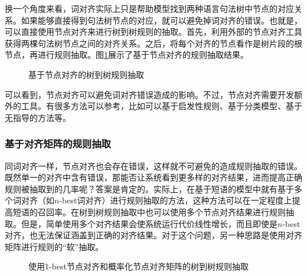 \parinterval 换一个角度来看，词对齐实际上只是帮助模型找到两种语言句法树中节点的对应关系。如果能够直接得到句法树节点的对应，就可以避免掉词对齐的错误。也就是，可以直接使用节点对齐来进行树到树规则的抽取。首先，利用外部的节点对齐工具获得两棵句法树节点之间的对齐关系。之后，将每个对齐的节点看作是树片段的根节点，再进行规则抽取。图\ref{fig:4-62}展示了基于节点对齐的规则抽取结果。

\begin{figure}[htb]
\centering

\caption{基于节点对齐的树到树规则抽取}
\label{fig:4-62}
\end{figure}

\parinterval 可以看到，节点对齐可以避免词对齐错误造成的影响。不过，节点对齐需要开发额外的工具。有很多方法可以参考，比如可以基于启发性规则\cite{DBLP:conf/coling/GrovesHW04}、基于分类模型\cite{DBLP:conf/coling/SunZT10}、基于无指导的方法\cite{xiao2013unsupervised}等。


\subsubsection{基于对齐矩阵的规则抽取}

\parinterval 同词对齐一样，节点对齐也会存在错误，这样就不可避免的造成规则抽取的错误。既然单一的对齐中含有错误，那能否让系统看到更多样的对齐结果，进而提高正确规则被抽取到的几率呢？答案是肯定的。实际上，在基于短语的模型中就有基于多个词对齐（如$n$-best词对齐）进行规则抽取的方法，这种方法可以在一定程度上提高短语的召回率。在树到树规则抽取中也可以使用多个节点对齐结果进行规则抽取。但是，简单使用多个对齐结果会使系统运行代价线性增长，而且即使是$n$-best对齐，也无法保证涵盖到正确的对齐结果。对于这个问题，另一种思路是使用对齐矩阵进行规则的``软''抽取。

\begin{figure}[htp]
\centering

\caption{使用1-best节点对齐和概率化节点对齐矩阵的树到树规则抽取\cite{xiao2013unsupervised}}
\label{fig:4-63}
\end{figure}

